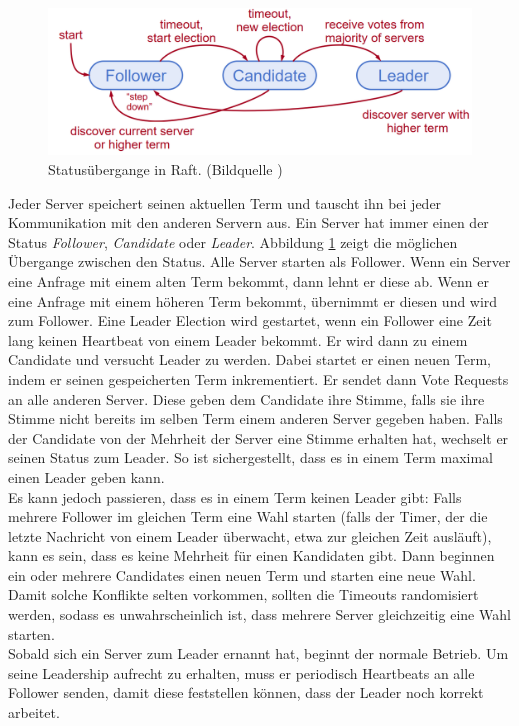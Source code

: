 \begin{figure}[H]
	\centering
	\includegraphics[width=\textwidth]{img/states.png}
	\caption{Statusübergange in Raft.  (Bildquelle \cite{raft-user-study})}
	\label{fig:states}
\end{figure}

Jeder Server speichert seinen aktuellen Term und tauscht ihn bei jeder Kommunikation mit den anderen Servern aus. 
Ein Server hat immer einen der Status \textit{Follower}, \textit{Candidate} oder \textit{Leader}. Abbildung \ref{fig:states} zeigt die möglichen Übergange zwischen den Status. Alle Server starten als Follower. Wenn ein Server eine Anfrage mit einem alten Term bekommt, dann lehnt er diese ab. Wenn er eine Anfrage mit einem höheren Term bekommt, übernimmt er diesen und wird zum Follower. Eine Leader Election wird gestartet, wenn ein Follower eine Zeit lang keinen Heartbeat von einem Leader bekommt. Er wird dann zu einem Candidate und versucht Leader zu werden. Dabei startet er einen neuen Term, indem er seinen gespeicherten Term inkrementiert. Er sendet dann Vote Requests an alle anderen Server. Diese geben dem Candidate ihre Stimme, falls sie ihre Stimme nicht bereits im selben Term einem anderen Server gegeben haben. Falls der Candidate von der Mehrheit der Server eine Stimme erhalten hat, wechselt er seinen Status zum Leader. So ist sichergestellt, dass es in einem Term maximal einen Leader geben kann. \\
Es kann jedoch passieren, dass es in einem Term keinen Leader gibt: Falls mehrere Follower im gleichen Term eine Wahl starten (falls der Timer, der die letzte Nachricht von einem Leader überwacht, etwa zur gleichen Zeit ausläuft), kann es sein, dass es keine Mehrheit für einen Kandidaten gibt. Dann beginnen ein oder mehrere Candidates einen neuen Term und starten eine neue Wahl. Damit solche Konflikte selten vorkommen, sollten die Timeouts randomisiert werden, sodass es unwahrscheinlich ist, dass mehrere Server gleichzeitig eine Wahl starten. \\
Sobald sich ein Server zum Leader ernannt hat, beginnt der normale Betrieb. Um seine Leadership aufrecht zu erhalten, muss er periodisch Heartbeats an alle Follower senden, damit diese feststellen können, dass der Leader noch korrekt arbeitet. 

